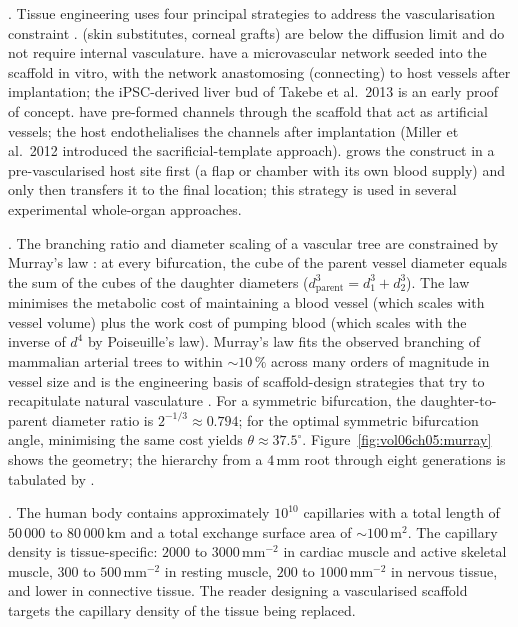 . Tissue engineering uses four principal
strategies to address the vascularisation constraint
\cite{paper:v6c05-novosel-vascularisation-review-2011}.  (skin substitutes, corneal grafts) are below the
diffusion limit and do not require internal vasculature.
 have a microvascular network
seeded into the scaffold in vitro, with the network anastomosing
(connecting) to host vessels after implantation; the iPSC-derived
liver bud of Takebe et al.\ 2013 \cite{paper:v6c05-takebe-liver-2013}
is an early proof of concept. 
have pre-formed channels through the scaffold that act as artificial
vessels; the host endothelialises the channels after implantation
(Miller et al.\ 2012 \cite{paper:v6c05-miller-vascular-print-2012}
introduced the sacrificial-template approach).
 grows the construct in a
pre-vascularised host site first (a flap or chamber with its own
blood supply) and only then transfers it to the final location; this
strategy is used in several experimental whole-organ approaches.

. The branching ratio and diameter
scaling of a vascular tree are constrained by Murray's law
\cite{paper:v6c05-murray-1926}: at every bifurcation, the cube of
the parent vessel diameter equals the sum of the cubes of the
daughter diameters ($d_{\text{parent}}^3 = d_1^3 + d_2^3$). The law
minimises the metabolic cost of maintaining a blood vessel (which
scales with vessel volume) plus the work cost of pumping blood
(which scales with the inverse of $d^4$ by Poiseuille's law).
Murray's law fits the observed branching of mammalian arterial trees
to within $\sim 10\,\%$ across many orders of magnitude in vessel
size and is the engineering basis of scaffold-design strategies that
try to recapitulate natural vasculature
\cite[ch.~5]{text:phillips-physical-biology}. For a symmetric
bifurcation, the daughter-to-parent diameter ratio is
$2^{-1/3} \approx 0.794$; for the optimal symmetric bifurcation angle,
minimising the same cost yields $\theta \approx 37.5^{\circ}$.
Figure~\ref{fig:vol06ch05:murray} shows the geometry; the
hierarchy from a $4\,\text{mm}$ root through eight generations is
tabulated by .



. The human body contains approximately
$10^{10}$ capillaries with a total length of $50\,000$ to $80\,000\,\text{km}$
and a total exchange surface area of $\sim 100\,\text{m}^2$. The
capillary density is tissue-specific: $2000$ to $3000\,\text{mm}^{-2}$
in cardiac muscle and active skeletal muscle, $300$ to
$500\,\text{mm}^{-2}$ in resting muscle, $200$ to
$1000\,\text{mm}^{-2}$ in nervous tissue, and lower in connective
tissue. The reader designing a vascularised scaffold targets the
capillary density of the tissue being replaced.


